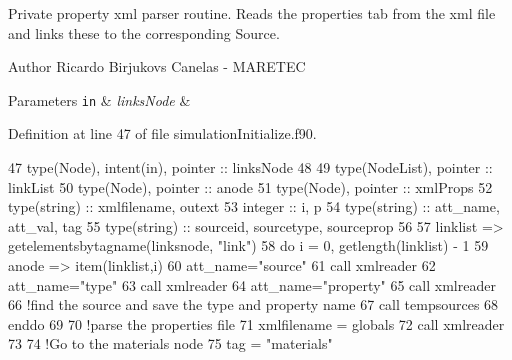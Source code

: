 Private property xml parser routine. Reads the properties tab from the xml file and links these to the corresponding Source. 

\begin{DoxyAuthor}{Author}
Ricardo Birjukovs Canelas -\/ M\+A\+R\+E\+T\+EC 
\end{DoxyAuthor}

\begin{DoxyParams}[1]{Parameters}
\mbox{\tt in}  & {\em links\+Node} & \\
\hline
\end{DoxyParams}


Definition at line 47 of file simulation\+Initialize.\+f90.


\begin{DoxyCode}
47     \textcolor{keywordtype}{type}(Node), \textcolor{keywordtype}{intent(in)}, \textcolor{keywordtype}{pointer} :: linksNode
48 
49     \textcolor{keywordtype}{type}(NodeList), \textcolor{keywordtype}{pointer} :: linkList
50     \textcolor{keywordtype}{type}(Node), \textcolor{keywordtype}{pointer} :: anode
51     \textcolor{keywordtype}{type}(Node), \textcolor{keywordtype}{pointer} :: xmlProps
52     \textcolor{keywordtype}{type}(string) :: xmlfilename, outext
53     \textcolor{keywordtype}{integer} :: i, p
54     \textcolor{keywordtype}{type}(string) :: att\_name, att\_val, tag
55     \textcolor{keywordtype}{type}(string) :: sourceid, sourcetype, sourceprop
56 
57     linklist => getelementsbytagname(linksnode, \textcolor{stringliteral}{"link"})
58     \textcolor{keywordflow}{do} i = 0, getlength(linklist) - 1
59         anode => item(linklist,i)
60         att\_name=\textcolor{stringliteral}{"source"}
61         \textcolor{keyword}{call }xmlreader%
62         att\_name=\textcolor{stringliteral}{"type"}
63         \textcolor{keyword}{call }xmlreader%
64         att\_name=\textcolor{stringliteral}{"property"}
65         \textcolor{keyword}{call }xmlreader%
66         \textcolor{comment}{!find the source and save the type and property name}
67         \textcolor{keyword}{call }tempsources%
68 \textcolor{keywordflow}{    enddo}
69 
70     \textcolor{comment}{!parse the properties file}
71     xmlfilename = globals%
72     \textcolor{keyword}{call }xmlreader%
73 
74     \textcolor{comment}{!Go to the materials node}
75     tag = \textcolor{stringliteral}{"materials"}

\end{DoxyCode}
